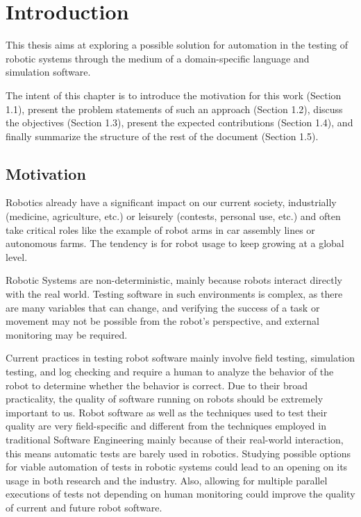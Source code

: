 \chapter{Introduction}
\label{chap:introduction}

This thesis aims at exploring a possible solution for automation in the testing of robotic systems through the medium of a domain-specific language and simulation software.

The intent of this chapter is to introduce the motivation for this work (Section 1.1), present the problem statements of such an approach (Section 1.2), discuss the objectives (Section 1.3), present the expected contributions (Section 1.4), and finally summarize the structure of the rest of the document (Section 1.5).


\section{Motivation}
\label{sec:motivation}

Robotics already have a significant impact on our current society, industrially (medicine, agriculture, etc.) or leisurely (contests, personal use, etc.) and often take critical roles like the example of robot arms in car assembly lines or autonomous farms. The tendency is for robot usage to keep growing at a global level. 

Robotic Systems are non-deterministic, mainly because robots interact directly with the real world. Testing software in such environments is complex, as there are many variables that can change, and verifying the success of a task or movement may not be possible from the robot's perspective, and external monitoring may be required.

Current practices in testing robot software mainly involve field testing, simulation testing, and log checking and require a human to analyze the behavior of the robot to determine whether the behavior is correct. Due to their broad practicality, the quality of software running on robots should be extremely important to us. Robot software as well as the techniques used to test their quality are very field-specific and different from the techniques employed in traditional Software Engineering mainly because of their real-world interaction, this means automatic tests are barely used in robotics. Studying possible options for viable automation of tests in robotic systems could lead to an opening on its usage in both research and the industry. Also, allowing for multiple parallel executions of tests not depending on human monitoring could improve the quality of current and future robot software.


